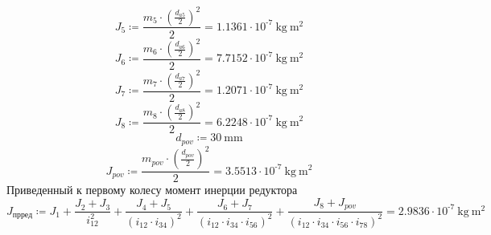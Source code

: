 \documentclass{article}
\newcommand{\defeq}{\coloneq} %
\begin{document}
\begin{equation*}
\textit{J}_{\textit{5}} \defeq \frac{\textit{m}_{\textit{5}} \cdot \left( \frac{\textit{d}_{\textit{a5}}}{2} \right)^{2}}{2} = {1.1361 \cdot 10^{ \operatorname{-} 7} \: \mathrm{kg} \: \mathrm{m}^{2}}
\end{equation*}
\begin{equation*}
\textit{J}_{\textit{6}} \defeq \frac{\textit{m}_{\textit{6}} \cdot \left( \frac{\textit{d}_{\textit{a6}}}{2} \right)^{2}}{2} = {7.7152 \cdot 10^{ \operatorname{-} 7} \: \mathrm{kg} \: \mathrm{m}^{2}}
\end{equation*}
\begin{equation*}
\textit{J}_{\textit{7}} \defeq \frac{\textit{m}_{\textit{7}} \cdot \left( \frac{\textit{d}_{\textit{a7}}}{2} \right)^{2}}{2} = {1.2071 \cdot 10^{ \operatorname{-} 7} \: \mathrm{kg} \: \mathrm{m}^{2}}
\end{equation*}
\begin{equation*}
\textit{J}_{\textit{8}} \defeq \frac{\textit{m}_{\textit{8}} \cdot \left( \frac{\textit{d}_{\textit{a8}}}{2} \right)^{2}}{2} = {6.2248 \cdot 10^{ \operatorname{-} 7} \: \mathrm{kg} \: \mathrm{m}^{2}}
\end{equation*}
\begin{equation*}
d_{pov} \defeq 30 \: \mathrm{mm}
\end{equation*}
\begin{equation*}
J_{pov} \defeq \frac{m_{pov} \cdot \left( \frac{d_{pov}}{2} \right)^{2}}{2} = {3.5513 \cdot 10^{ \operatorname{-} 7} \: \mathrm{kg} \: \mathrm{m}^{2}}
\end{equation*}
\colorbox[HTML]{000000}{Приведенный к первому колесу момент инерции редуктора}\newline
\begin{equation*}
J_{прред} \defeq \textit{J}_{\textit{1}}+\frac{\textit{J}_{\textit{2}}+\textit{J}_{\textit{3}}}{\textit{i}_{\textit{12}}^{2}}+\frac{\textit{J}_{\textit{4}}+\textit{J}_{\textit{5}}}{\left( \textit{i}_{\textit{12}} \cdot \textit{i}_{\textit{34}} \right)^{2}}+\frac{\textit{J}_{\textit{6}}+\textit{J}_{\textit{7}}}{\left( \textit{i}_{\textit{12}} \cdot \textit{i}_{\textit{34}} \cdot \textit{i}_{\textit{56}} \right)^{2}}+\frac{\textit{J}_{\textit{8}}+J_{pov}}{\left( \textit{i}_{\textit{12}} \cdot \textit{i}_{\textit{34}} \cdot \textit{i}_{\textit{56}} \cdot \textit{i}_{\textit{78}} \right)^{2}} = {2.9836 \cdot 10^{ \operatorname{-} 7} \: \mathrm{kg} \: \mathrm{m}^{2}}
\end{equation*}
\end{document}
